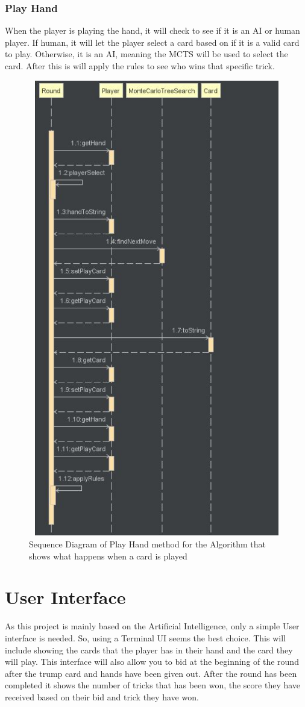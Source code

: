 \subsubsection{Play Hand}
When the player is playing the hand, it will check to see if it is an AI or human player. If human, it will let the player select a card based on if it is a valid card to play. Otherwise, it is an AI, meaning the MCTS will be used to select the card. After this is will apply the rules to see who wins that specific trick.
\begin{figure}
\centering
\includegraphics[width=15cm ,height=20cm,keepaspectratio]{PlayHandSequenceDiagram}
\caption{Sequence Diagram of Play Hand method for the Algorithm that shows what happens when a card is played}
\label{fig:Play}
\end{figure}
\section{User Interface}
As this project is mainly based on the Artificial Intelligence, only a simple User interface is needed. So, using a Terminal UI seems the best choice. This will include showing the cards that the player has in their hand and the card they will play. This interface will also allow you to bid at the beginning of the round after the trump card and hands have been given out. After the round has been completed it shows the number of tricks that has been won, the score they have received based on their bid and trick they have won.
